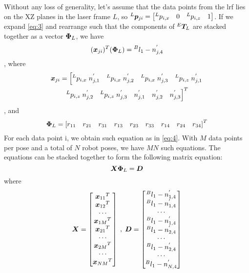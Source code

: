 Without any loss of generality, let's assume that the data points from the \ac{lrf} lies on the XZ planes in the laser frame $L$, so ${^L}\vb*{p}_{ji} = \left[{^L}p_{i,x} \quad 0 \quad {^L}p_{i,z}\quad 1\right]$. If we expand \eqref{eq:3} and rearrange such that the components of ${^E}\vb*{T}_L$ are stacked together as a vector $\vb*{\Phi}_L$, we have
\begin{equation}
\label{eq:4}
  (\vb*{x}_{ji})  ^T (\vb*{\Phi}_L) = {^B}l_1 -  n^{'}_{j,4}
\end{equation}
, where 
\begin{multline}
  \vb*{x}_{ji} = \left[{^L}p_{i,x}\;n^{'}_{j,1} \quad {^L}p_{i,x}\;n^{'}_{j,2}\quad {^L}p_{i,x}\;n^{'}_{j,3}\quad  {^L}p_{i,z}\;n^{'}_{j,1}\right. \\ 
\left. {^L}p_{i,z}\;n^{'}_{j,2}\quad {^L}p_{i,z}\;n^{'}_{j,3} \quad n^{'}_{j,1} \quad n^{'}_{j,2} \quad n^{'}_{j,3} \right]^T
\end{multline}, 
and
\begin{multline}
  \vb*{\Phi}_L= \left[r_{11} \quad r_{21} \quad r_{31} \quad r_{13} \quad r_{23} \quad r_{33} \quad r_{14} \quad r_{24}  \quad r_{34} \right] ^T
\end{multline}
For each data point i, we obtain such equation as in \eqref{eq:4}. With $M$ data points per pose and a total of $N$ robot poses, we have $MN$ such equations. The equations can be stacked together to form the following matrix equation:
\begin{equation}
\label{eq:7}
  \vb*{X}   \vb*{\Phi}_L= \vb*{D}
\end{equation}
where 
\begin{equation}
\vb*{X} =\begin{bmatrix}
{\vb*{x}_{11}}^T \\ {\vb*{x}_{12}}^T  \\ \cdots\\{\vb*{x}_{1M}}^T \\ {\vb*{x}_{21}}^T \\ \cdots\\ {\vb*{x}_{2M}}^T  \\ \cdots \\ {\vb*{x}_{NM}}^T 
\end{bmatrix} \;, \; \vb*{D} =\begin{bmatrix}
{^B}l_1 -  n^{'}_{1,4} \\ {^B}l_1 -  n^{'}_{1,4}  \\ \cdots\\ {^B}l_1 -  n^{'}_{1,4}  \\ {^B}l_1 -  n^{'}_{2,4} \\ \cdots\\ {^B}l_1 -  n^{'}_{2,4}  \\ \cdots \\{^B}l_1 -  n^{'}_{N,4} 
\end{bmatrix}
\end{equation}

